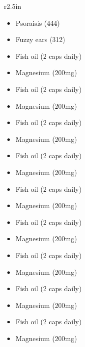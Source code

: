 \documentclass[11pt]{letter}
\newenvironment{alert}
{ \begin{wrapfigure}{c}{\linewidth} \vspace{-5pt} \begin{alertbox}}
{ \end{alertbox} \end{wrapfigure} }
\begin{document}
%

\begin{wrapfigure}{r}{2.5in}


  \begin{sidebox}[frametitle={Problem List}]
    \begin{itemize}
      \item Psoraisis (444)
      \item Fuzzy ears (312)
    \end{itemize}
  \end{sidebox}

  \vspace*{11pt}

  \begin{sidebox}[frametitle={Currently Taking}]
    \begin{itemize}
      \item Fish oil (2 caps daily)
      \item Magnesium (200mg)
      \item Fish oil (2 caps daily)
      \item Magnesium (200mg)
      \item Fish oil (2 caps daily)
      \item Magnesium (200mg)
      \item Fish oil (2 caps daily)
      \item Magnesium (200mg)
      \item Fish oil (2 caps daily)
      \item Magnesium (200mg)
      \item Fish oil (2 caps daily)
      \item Magnesium (200mg)
      \item Fish oil (2 caps daily)
      \item Magnesium (200mg)
      \item Fish oil (2 caps daily)
      \item Magnesium (200mg)
      \item Fish oil (2 caps daily)
      \item Magnesium (200mg)
    \end{itemize}
  \end{sidebox}

\end{wrapfigure}


\lipsum[1-2]

\hrulefill

\lipsum[2-3]
\end{document}
